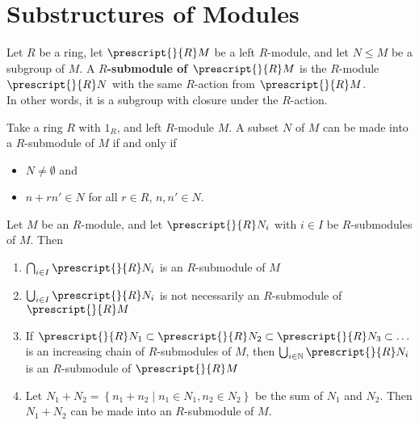 \documentclass{memoir}
\begin{document}


\section{Substructures of Modules}
\label{sec:substructures_of_modules}

\begin{defn}[Submodule]
	Let \(R\) be a ring, let \(\prescript{}{R}M\) be a left \(R\)-module, and let \(N\leq M\) be a subgroup of \(M\). A \textbf{\(R\)-submodule of \(\prescript{}{R}M\)} is the \(R\)-module \(\prescript{}{R}N\) with the same \(R\)-action from \(\prescript{}{R}M\).\\

	In other words, it is a subgroup with closure under the \(R\)-action.
\end{defn}

\begin{prop}
	Take a ring \(R\) with \(1_R\), and left \(R\)-module \(M\). A subset \(N\) of \(M\) can be made into a \(R\)-submodule of \(M\) if and only if
	\begin{itemize}
		\item \(N \neq \emptyset\) and
		\item \(n+rn' \in N\) for all \(r \in R\), \(n,n' \in N\).
	\end{itemize}
\end{prop}

\begin{prop}
	Let \(M\) be an \(R\)-module, and let \(\prescript{}{R}N_{i}\) with \(i \in I\) be \(R\)-submodules of \(M\). Then
	\begin{enumerate}
		\item \(\bigcap_{i \in  I} \prescript{}{R}N_i\) is an \(R\)-submodule of \(M\) 
		\item \(\bigcup_{i \in  I} \prescript{}{R}N_i\) is not necessarily an \(R\)-submodule of \(\prescript{}{R}M\)
		\item If \(\prescript{}{R}N_1\subset \prescript{}{R}N_2\subset \prescript{}{R}N_3\subset \ldots\) is an increasing chain of \(R\)-submodules of \(M\), then \(\bigcup_{i \in \N} \prescript{}{R}N_i\) is an \(R\)-submodule of \(\prescript{}{R}M\)
		\item Let \(N_1+N_2 = \left\{n_1+n_2 \mid n_1 \in N_1, n_2 \in N_2 \right\} \) be the sum of \(N_1\) and \(N_2\). Then \(N_1+N_2\) can be made into an \(R\)-submodule of \(M\).
	\end{enumerate}
\end{prop}
\end{document}
